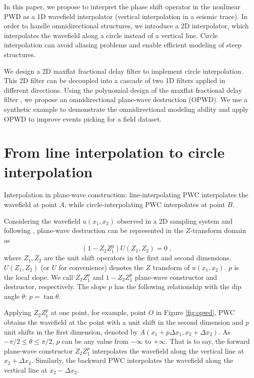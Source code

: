 In this paper, we propose to interpret
the phase shift operator in the nonlinear PWD as 
a 1D wavefield interpolator 
(vertical interpolation in a seismic trace).
In order to handle omnidirectional structures,
we introduce a 2D interpolator,
which interpolates the wavefield along
a circle instead of a vertical line.
Circle interpolation can avoid aliasing problems and enable
efficient modeling of steep structures.

We design a 2D maxflat fractional delay filter 
to implement circle interpolation.
This 2D filter can be decoupled into
a cascade of two 1D filters applied
in different directions.
Using the polynomial design of the maxflat fractional delay filter
\cite[]{chen:2012a},
we propose an omnidirectional plane-wave destruction (OPWD).
We use a synthetic example to demonstrate 
the omnidirectional modeling ability
and apply OPWD to improve events picking 
for a field dataset.



\section{From line interpolation to circle interpolation}

{Interpolation in plane-wave construction: 
line-interpolating PWC interpolates the wavefield at point $A$,
while circle-interpolating PWC interpolates at point $B$.}

Considering the wavefield $u(x_1,x_2)$ observed in a 2D sampling system
and following \cite{fomel:1946}, plane-wave 
destruction can be represented in the $Z$-transform domain as
\begin{equation}\label{eq:pwd}
(1-Z_2Z_1^p)U(Z_1,Z_2)=0\;,
\end{equation}
where
$Z_1, Z_2$ are the unit shift operators in the first and second dimensions.
$U(Z_1,Z_2)$ (or $U$ for convenience) 
denotes the $Z$ transform of $u(x_1,x_2)$.
$p$ is the local slope. We call
$Z_2Z_1^p$ and $1-Z_2Z_1^p$
plane-wave constructor and destructor, respectively.
The slope $p$ has the following relationship with the dip angle $\theta$:
$p=\tan \theta$.

Applying 
$Z_2Z_1^p$ at one point, 
for example, point $O$ in Figure \ref{fig:opwd},
PWC obtains the wavefield at the point
with a unit shift in the second dimension and 
$p$ unit shifts in the first dimension,
denoted by $A(x_1+p\Delta x_1,x_2+\Delta x_2)$.
As $-\pi/2 \leq \theta \leq \pi/2$, 
$p$ can be any value from $-\infty$ to $+\infty$.
That is to say, the forward plane-wave constructor $Z_2Z_1^p$
interpolates 
the wavefield along the vertical line at $x_2+\Delta x_2$.
Similarly, the backward PWC interpolates the wavefield
along the vertical line at $x_2-\Delta x_2$.

